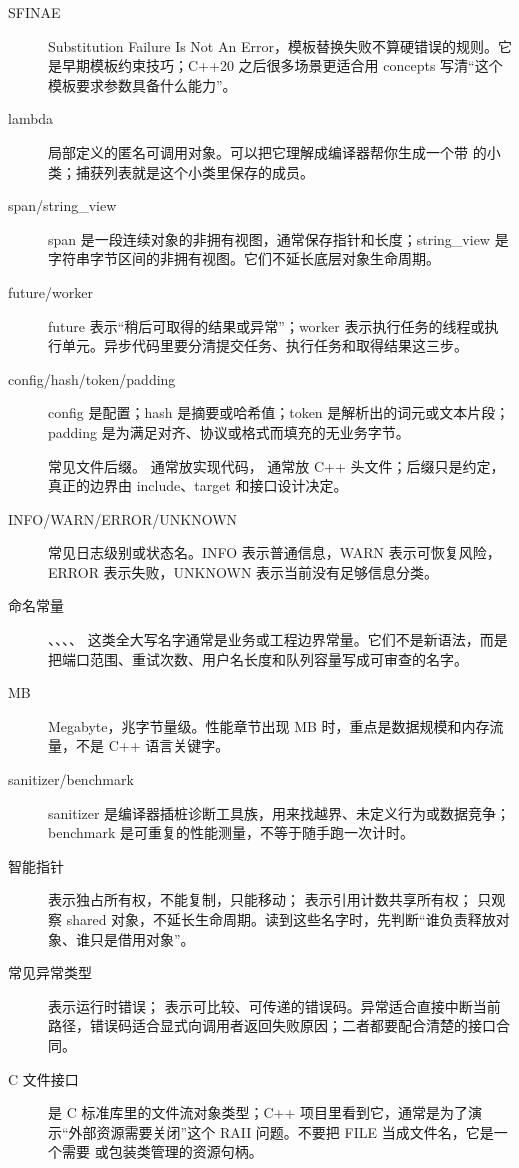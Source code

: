 \begin{description}
  \item[SFINAE] Substitution Failure Is Not An Error，模板替换失败不算硬错误的规则。它是早期模板约束技巧；C++20 之后很多场景更适合用 concepts 写清“这个模板要求参数具备什么能力”。
  \item[lambda] 局部定义的匿名可调用对象。可以把它理解成编译器帮你生成一个带  的小类；捕获列表就是这个小类里保存的成员。
  \item[span/string\_view] span 是一段连续对象的非拥有视图，通常保存指针和长度；string\_view 是字符串字节区间的非拥有视图。它们不延长底层对象生命周期。
  \item[future/worker] future 表示“稍后可取得的结果或异常”；worker 表示执行任务的线程或执行单元。异步代码里要分清提交任务、执行任务和取得结果这三步。
  \item[config/hash/token/padding] config 是配置；hash 是摘要或哈希值；token 是解析出的词元或文本片段；padding 是为满足对齐、协议或格式而填充的无业务字节。
  \item[] 常见文件后缀。 通常放实现代码， 通常放 C++ 头文件；后缀只是约定，真正的边界由 include、target 和接口设计决定。
  \item[INFO/WARN/ERROR/UNKNOWN] 常见日志级别或状态名。INFO 表示普通信息，WARN 表示可恢复风险，ERROR 表示失败，UNKNOWN 表示当前没有足够信息分类。
  \item[命名常量] 、、、、 这类全大写名字通常是业务或工程边界常量。它们不是新语法，而是把端口范围、重试次数、用户名长度和队列容量写成可审查的名字。
  \item[MB] Megabyte，兆字节量级。性能章节出现 MB 时，重点是数据规模和内存流量，不是 C++ 语言关键字。
  \item[sanitizer/benchmark] sanitizer 是编译器插桩诊断工具族，用来找越界、未定义行为或数据竞争；benchmark 是可重复的性能测量，不等于随手跑一次计时。
  \item[智能指针]  表示独占所有权，不能复制，只能移动； 表示引用计数共享所有权； 只观察 shared 对象，不延长生命周期。读到这些名字时，先判断“谁负责释放对象、谁只是借用对象”。
  \item[常见异常类型]  表示运行时错误； 表示可比较、可传递的错误码。异常适合直接中断当前路径，错误码适合显式向调用者返回失败原因；二者都要配合清楚的接口合同。
  \item[C 文件接口]  是 C 标准库里的文件流对象类型；C++ 项目里看到它，通常是为了演示“外部资源需要关闭”这个 RAII 问题。不要把 FILE 当成文件名，它是一个需要  或包装类管理的资源句柄。

\end{description}
